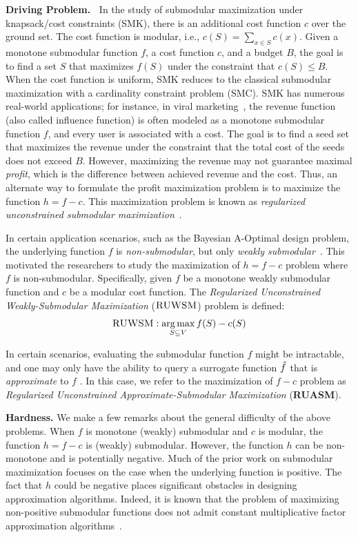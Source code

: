 \documentclass[10pt]{article} %
\DeclareMathOperator*{\argmax}{arg\,max}
\theoremstyle{remark}
\begin{document}
\textbf{Driving Problem.\ } In the study of submodular maximization under knapsack/cost constraints (SMK), there is an additional cost function $c$ over the ground set. The cost function is modular, i.e., $c(S) = \sum_{x \in S} c(x)$. Given a monotone submodular function $f$, a cost function $c$, and a budget $B$,  the goal is to find a set $S$ that maximizes $f(S)$ under the constraint that $c(S) \leq B$. When the cost function is uniform, SMK reduces to the classical submodular maximization with a cardinality constraint problem (SMC).
SMK has numerous real-world applications; for instance, in viral marketing~\cite{kempe2003maximizing}, the revenue function (also called influence function) is often modeled as a monotone submodular function $f$, and every user is associated with a cost. The goal is to find a seed set that maximizes the revenue under the constraint that the total cost of the seeds does not exceed $B$.
However, maximizing the revenue may not guarantee maximal {\em profit}, which is the difference between achieved revenue and the cost. Thus, an alternate way to formulate the profit maximization problem is to maximize the function $h = f-c$. This maximization problem is known as {\em regularized unconstrained submodular maximization}~\cite{bodek2022maximizing}.

In certain application scenarios, such as the Bayesian A-Optimal design problem, the underlying function $f$ is \textit{non-submodular}, but only {\em weakly submodular}~\cite{harshaw2019submodular}.
This motivated the researchers to study the maximization of $h=f-c$ problem where $f$ is non-submodular. Specifically, given $f$ be a monotone weakly submodular function and $c$ be a modular cost function. The \textit{Regularized Unconstrained Weakly-Submodular Maximization} ($\textbf{\sc RUWSM}$) problem is defined:
\[ \textbf{\sc RUWSM} :  \argmax_{S \subseteq V} f(S)-c(S) \]


In certain scenarios, evaluating the submodular function $f$ might be intractable, and one may only have the ability to query a surrogate function $\Tilde{f}$ that is \textit{approximate} to $f$ \cite{cohen2014sketch}.  In this case, we refer to the maximization of $f-c$ problem as 
\textit{Regularized Unconstrained Approximate-Submodular Maximization} (\textbf{\sc RUASM}).


\textbf{Hardness. } We make a few remarks about the general difficulty of the above problems.  When $f$ is monotone (weakly) submodular and $c$ is modular, the function $h=f-c$ is (weakly) submodular. However, the function $h$ can be non-monotone and is potentially negative. Much of the prior work on submodular maximization focuses on the case when the underlying function is positive. The fact that $h$ could be negative places significant obstacles in designing approximation algorithms. 
Indeed, it is known that the problem of maximizing non-positive submodular functions does not admit constant multiplicative factor approximation algorithms~\cite{papadimitriou1988optimization, feige1998threshold,bodek2022maximizing}.
\end{document}
